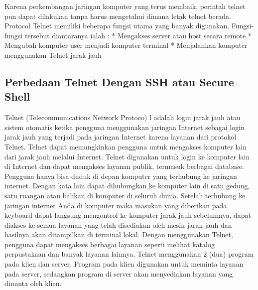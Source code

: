 Karena perkembangan jaringan komputer yang terus membaik, perintah telnet pun dapat dilakukan tanpa harus mengetahui dimana letak telnet berada. Protocol Telnet memiliki beberapa fungsi utama yang banyak digunakan. Fungsi-fungsi tersebut diantaranya ialah :
* Mengakses server atau host secara remote
* Mengubah komputer user menjadi komputer terminal
* Menjalankan komputer menggunakan Telnet jarak jauh


\subsection {Perbedaan Telnet Dengan SSH atau Secure Shell}

Telnet (Telecommunications Network Protoco) l adalah login jarak jauh atau sistem otomatis ketika pengguna menggunakan jaringan Internet sebagai login jarak jauh yang terjadi pada jaringan Internet karena layanan dari protokol Telnet. Telnet dapat memungkinkan pengguna untuk mengakses komputer lain dari jarak jauh melalui Internet. Telnet digunakan untuk login ke komputer lain di Internet dan dapat mengakses layanan publik, termasuk berbagai database. Pengguna hanya bisa duduk di depan komputer yang terhubung ke jaringan internet. Dengan kata lain dapat dihubungkan ke komputer lain di satu gedung, satu ruangan atau bahkan di komputer di seluruh dunia. Setelah terhubung ke jaringan internet Anda di komputer maka masukan yang diberikan pada keyboard dapat langsung mengontrol ke komputer jarak jauh sebelumnya, dapat diakses ke semua layanan yang telah disediakan oleh mesin jarak jauh dan hasilnya akan ditampilkan di terminal lokal. Dengan menggunakan Telnet, pengguna dapat mengakses berbagai layanan seperti melihat katalog perpustakaan dan banyak layanan lainnya. Telnet menggunakan 2 (dua) program pada klien dan server. Program pada klien digunakan untuk meminta layanan pada server, sedangkan program di server akan menyediakan layanan yang diminta oleh klien.
